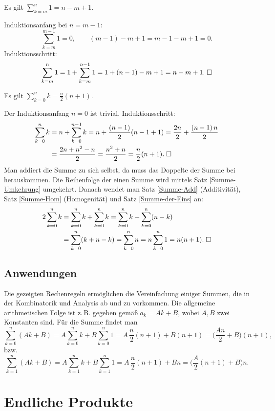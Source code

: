 \begin{Satz}\label{Summe-der-Eins}
Es gilt
$\sum_{k=m}^n 1 = n-m+1$.
\end{Satz}
 Induktionsanfang bei $n=m-1$:
\[\sum_{k=m}^{m-1} 1=0,\qquad (m-1)-m+1 = m-1-m+1 = 0.\]
Induktionsschritt:
\[\sum_{k=m}^n 1 = 1+\sum_{k=m}^{n-1} 1 = 1+(n-1)-m+1 = n-m+1.\;\Box\]

\newpage
\begin{Satz}
Es gilt $\sum_{k=0}^n k = \frac{n}{2}(n+1)$.
\end{Satz}
 Der Induktionsanfang $n=0$ ist trivial.
Induktionsschritt:
\begin{align*}
\sum_{k=0}^n k &= n+\sum_{k=0}^{n-1} k = n+\frac{(n-1)}{2}(n-1+1)
= \frac{2n}{2}+\frac{(n-1)\,n}{2}\\
&= \frac{2n+n^2-n}{2} = \frac{n^2+n}{2}
= \frac{n}{2}(n+1).\;\Box
\end{align*}
 Man addiert die Summe
zu sich selbst, da muss das Doppelte der Summe bei herauskommen.
Die Reihenfolge der einen Summe wird mittels Satz \ref{Summe-Umkehrung}
umgekehrt. Danach wendet man Satz \ref{Summe-Add} (Additivität),
Satz \ref{Summe-Hom} (Homogenität) und Satz \ref{Summe-der-Eins} an:
\begin{align*}
2\sum_{k=0}^n k &= \sum_{k=0}^n k+\sum_{k=0}^n k
= \sum_{k=0}^n k + \sum_{k=0}^n (n-k)\\
&= \sum_{k=0}^n (k+n-k) = \sum_{k=0}^n n
= n\sum_{k=0}^n 1 = n(n+1).\;\Box
\end{align*}

\subsection{Anwendungen}

Die gezeigten Rechenregeln ermöglichen die Vereinfachung
einiger Summen, die in der Kombinatorik und Analysis ab
und zu vorkommen. Die allgemeine arithmetischen Folge ist z.\,B.
gegeben gemäß $a_k=Ak+B$, wobei $A,B$ zwei Konstanten sind.
Für die Summe findet man
\[\sum_{k=0}^n (Ak+B)
= A\sum_{k=0}^n k+B\sum_{k=0}^n 1 = A\,\frac{n}{2}(n+1)+B(n+1)
= \Big(\frac{An}{2}+B\Big)(n+1),\]
bzw.
\[\sum_{k=1}^n (Ak+B)
= A\sum_{k=1}^n k + B\sum_{k=1}^n 1
= A\,\frac{n}{2}(n+1)+Bn = \Big(\frac{A}{2}(n+1)+B\Big)n.\]

\newpage
\section{Endliche Produkte}


